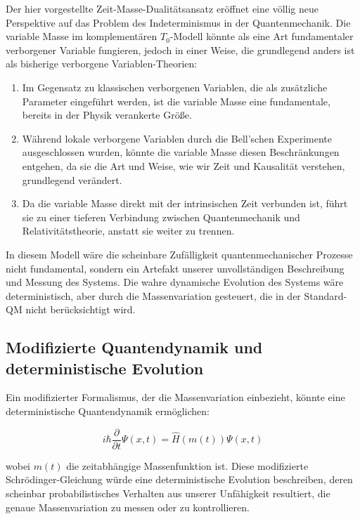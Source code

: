 \documentclass[12pt,a4paper]{article}  %
\begin{document}
	Der hier vorgestellte Zeit-Masse-Dualitätsansatz eröffnet eine völlig neue Perspektive auf das Problem des Indeterminismus in der Quantenmechanik. Die variable Masse im komplementären $T_0$-Modell könnte als eine Art fundamentaler verborgener Variable fungieren, jedoch in einer Weise, die grundlegend anders ist als bisherige verborgene Variablen-Theorien:
	
	\begin{enumerate}
		\item Im Gegensatz zu klassischen verborgenen Variablen, die als zusätzliche Parameter eingeführt werden, ist die variable Masse eine fundamentale, bereits in der Physik verankerte Größe.
		
		\item Während lokale verborgene Variablen durch die Bell'schen Experimente ausgeschlossen wurden, könnte die variable Masse diesen Beschränkungen entgehen, da sie die Art und Weise, wie wir Zeit und Kausalität verstehen, grundlegend verändert.
		
		\item Da die variable Masse direkt mit der intrinsischen Zeit verbunden ist, führt sie zu einer tieferen Verbindung zwischen Quantenmechanik und Relativitätstheorie, anstatt sie weiter zu trennen.
	\end{enumerate}
	
	In diesem Modell wäre die scheinbare Zufälligkeit quantenmechanischer Prozesse nicht fundamental, sondern ein Artefakt unserer unvollständigen Beschreibung und Messung des Systems. Die wahre dynamische Evolution des Systems wäre deterministisch, aber durch die Massenvariation gesteuert, die in der Standard-QM nicht berücksichtigt wird.
	
	\subsection{Modifizierte Quantendynamik und deterministische Evolution}
	
	Ein modifizierter Formalismus, der die Massenvariation einbezieht, könnte eine deterministische Quantendynamik ermöglichen:
	
	\begin{equation}
		i\hbar \frac{\partial}{\partial t}\Psi(x,t) = \hat{H}(m(t))\Psi(x,t)
	\end{equation}
	
	wobei $m(t)$ die zeitabhängige Massenfunktion ist. Diese modifizierte Schrödinger-Gleichung würde eine deterministische Evolution beschreiben, deren scheinbar probabilistisches Verhalten aus unserer Unfähigkeit resultiert, die genaue Massenvariation zu messen oder zu kontrollieren.
	
\end{document}
